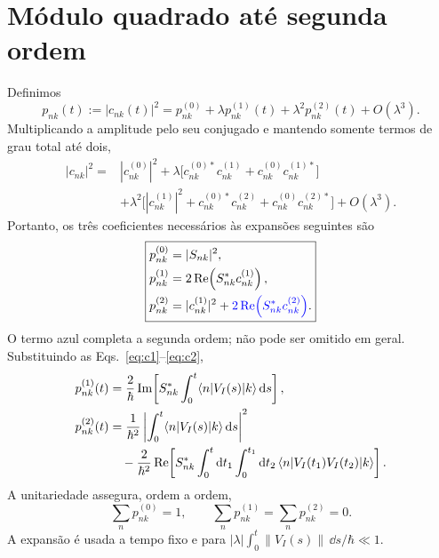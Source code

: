 \section{Módulo quadrado até segunda ordem}
Definimos
\begin{equation}
 p_{nk}(t):=|c_{nk}(t)|^2
 =p_{nk}^{(0)}+\lambda p_{nk}^{(1)}(t)
 +\lambda^2p_{nk}^{(2)}(t)+O(\lambda^3).
 \label{eq:pseries}
\end{equation}
Multiplicando a amplitude pelo seu conjugado e mantendo somente
termos de grau total até dois,
\begin{align}
 |c_{nk}|^2={}&|c_{nk}^{(0)}|^2
 +\lambda\big[c_{nk}^{(0)*}c_{nk}^{(1)}
              +c_{nk}^{(0)}c_{nk}^{(1)*}\big]\nonumber\\
 &+\lambda^2\big[|c_{nk}^{(1)}|^2
              +c_{nk}^{(0)*}c_{nk}^{(2)}
              +c_{nk}^{(0)}c_{nk}^{(2)*}\big]+O(\lambda^3).
 \label{eq:product}
\end{align}
Portanto, os três coeficientes necessários às expansões seguintes são
\begin{equation}
 \boxed{\begin{aligned}
 p_{nk}^{(0)}&=|S_{nk}|^2,\\
 p_{nk}^{(1)}&=2\operatorname{Re}\!\left(S_{nk}^*c_{nk}^{(1)}\right),\\
 p_{nk}^{(2)}&=|c_{nk}^{(1)}|^2+
 \textcolor{blue}{2\operatorname{Re}\!\left(S_{nk}^*c_{nk}^{(2)}\right)}.
 \end{aligned}}
 \label{eq:porders}
\end{equation}
O termo azul completa a segunda ordem; não pode ser omitido em geral.
Substituindo as Eqs.~\eqref{eq:c1}--\eqref{eq:c2},
\begin{align}
 p_{nk}^{(1)}(t)
 &=\frac{2}{\hbar}\operatorname{Im}\!\left[
 S_{nk}^*\int_0^t\langle n\rvert V_I(s)\lvert k\rangle\,\mathrm d s\right],\label{eq:p1potential}\\
 p_{nk}^{(2)}(t)
 &=\frac{1}{\hbar^2}
   \left|\int_0^t\langle n\rvert V_I(s)\lvert k\rangle\,\mathrm d s\right|^2\nonumber\\
 &\quad-\frac{2}{\hbar^2}\operatorname{Re}\!\left[
 S_{nk}^*\int_0^t\mathrm d t_1\int_0^{t_1}\mathrm d t_2\,
 \langle n\rvert V_I(t_1)V_I(t_2)\lvert k\rangle\right].\label{eq:p2potential}
\end{align}
A unitariedade assegura, ordem a ordem,
\begin{equation}
 \sum_n p_{nk}^{(0)}=1,\qquad
 \sum_n p_{nk}^{(1)}=\sum_n p_{nk}^{(2)}=0.
 \label{eq:normalization}
\end{equation}
A expansão é usada a tempo fixo e para
$|\lambda|\int_0^t\|V_I(s)\|\,\dd s/\hbar\ll1$.

